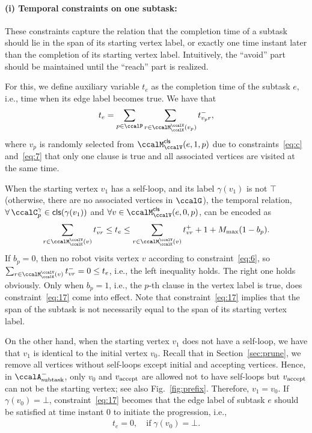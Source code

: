 \documentclass[Afour,sageh,times]{sagej}
\newcommand{\clause}[1]{\mathsf{cls}(#1)}
\newcommand{\auto}[1]{\ccalA_{\textup{#1}}}
\newcommand{\vertex}[1]{v_{\textup{#1}}}
\begin{document}
{{{{{\paragraph{(i) Temporal constraints on one subtask:}\label{sec:onesubtask} These constraints capture the relation that the completion time of a subtask should lie in the span of its starting vertex label, or exactly one time instant later than the completion of its starting vertex label. Intuitively, the ``avoid'' part should be maintained until the ``reach'' part is realized.

For this, we define auxiliary variable  $t_e$ as the completion time of the subtask $e$, i.e., time when its edge label  becomes true. We have  that
\begin{align}\label{eq:edgetime}
  t_e = \sum_{p\in \ccalP} \sum_{r\in \ccalM^\ccalV_{\ccalK}(v_p)}t_{v_p r}^-,
\end{align}
where $v_p$ is randomly selected from $\ccalM^\mathsf{cls}_\ccalV(e,1,p)$ due to constraints~\eqref{eq:c} and~\eqref{eq:7} that only one clause is true and all associated vertices are visited at the same time.

When the starting vertex $v_1$ has a self-loop, and its label $\gamma(v_1)$ is not  $\top$ (otherwise, there are no associated vertices in $\ccalG$), the temporal relation, $\forall\, \ccalC_p^{\gamma} \in \clause{\gamma(v_1)}$ and $\forall v \in \ccalM^\mathsf{cls}_\ccalV(e,0,p)$, can be encoded as
  \begin{align}
 \sum_{r\in \ccalM^\ccalV_{\ccalK}(v)} t_{vr}^-   \leq  t_e \leq
    \sum_{r\in \ccalM^\ccalV_{\ccalK}(v)} t_{vr}^+ + 1  + M_{\text{max}} (1 - b_{p}). \label{eq:17}
  \end{align}
  If $b_p=0$, then no robot visits vertex $v$ according to constraint~\eqref{eq:6}, so~$ \sum_{r\in \ccalM^\ccalV_{\ccalK}(v)} t_{vr}^- = 0 \leq t_e$, i.e., the left inequality holds. The right one holds obviously. Only when $b_p=1$, i.e., the $p$-th clause in the vertex label is true,  does constraint~\eqref{eq:17} come into effect. Note that constraint~\eqref{eq:17} implies that the span of the subtask is not necessarily equal to the span of its starting vertex label.

  On the other hand, when the starting vertex $v_1$ does not have a self-loop, we have that $v_1$ is identical to the initial vertex $v_0$. Recall that in Section~\ref{sec:prune}, we remove all vertices without self-loops except initial and accepting vertices. Hence, in $\auto{subtask}^-$, only $v_0$ and $\vertex{accept}$ are allowed not to have self-loops but $\vertex{accept}$ can not be the starting vertex; see also Fig.~\ref{fig:prefix}. Therefore, $v_1 = v_0$. If $\gamma(v_0) = \bot$,  constraint~\eqref{eq:17} becomes that the edge label of subtask $e$ should be satisfied at time instant 0 to initiate the progression, i.e.,
  \begin{align}
 t_e = 0, \quad \text{if}\; \gamma ({v_0}) = \bot. \label{eq:tis0}
  \end{align}



}}}}}
\end{document}
